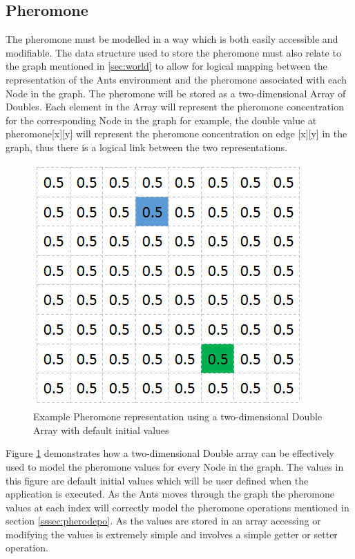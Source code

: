 \subsection{Pheromone}
\label{pheroRepsec}
The pheromone must be modelled in a way which is both easily accessible and modifiable. The data structure used to store the pheromone must also relate to the graph mentioned in \ref{sec:world} to allow for logical mapping between the representation of the Ants environment and the pheromone associated with each Node in the graph. The pheromone will be stored as a two-dimensional Array of Doubles. Each element in the Array will represent the pheromone concentration for the corresponding Node in the graph for example, the double value at pheromone[x][y] will represent the pheromone concentration on edge [x][y] in the graph, thus there is a logical link between the two representations.

\begin{figure}[H]
\centering
\includegraphics[scale=0.8]{Images/design/phero}
\caption{Example Pheromone representation using a two-dimensional Double Array with default initial values}
\label{fig:pheroRep}
\end{figure}

\noindent
Figure \ref{fig:pheroRep} demonstrates how a two-dimensional Double array can be effectively used to model the pheromone values for every Node in the graph. The values in this figure are default initial values which will be user defined when the application is executed. As the Ants moves through the graph the pheromone values at each index will correctly model the pheromone operations mentioned in section \ref{sssec:pherodepo}. As the values are stored in an array accessing or modifying the values is extremely simple and involves a simple getter or setter operation.

